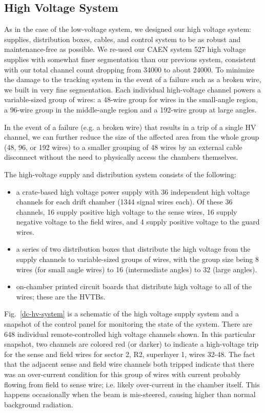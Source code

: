 \subsection{High Voltage System}

As in the case of the low-voltage system, we designed our high voltage system: 
supplies, distribution boxes, cables, and control system to be as robust and 
maintenance-free as possible.  
We re-used our CAEN 
system 527 high voltage supplies with somewhat finer segmentation than our 
previous system, consistent with our total channel count dropping from 34000 
to about 24000.
To minimize the damage to the tracking system in the event of a failure such as
a broken wire, we built in very fine segmentation.
Each individual high-voltage channel powers a variable-sized group of 
wires: a 48-wire group for wires in the small-angle region, a 96-wire group
in the middle-angle region and a 192-wire group at large angles.

In the event of a failure (e.g. a broken wire) that results in a trip
of a single HV channel, we can further reduce the size of the affected
area from the whole group (48, 96, or 192 wires) to a smaller grouping
of 48 wires by an external cable disconnect without the need to 
physically access the chambers themselves.

The high-voltage supply and distribution system consists of the following:
\begin{itemize}
\item a crate-based high voltage power supply with 36 independent
high voltage channels for each drift chamber (1344 signal wires each).
Of these 36 channels, 16 supply positive high voltage to the sense
wires, 16 supply negative voltage to the field wires, and 4 supply
positive voltage to the guard wires.
\item a series of two distribution boxes that distribute the high
voltage from the supply channels to variable-sized groups
of wires, with the group size being 8 wires (for small angle wires)
to 16 (intermediate angles) to 32 (large angles). 
\item  on-chamber printed circuit boards that distribute high voltage
to all of the wires; these are the HVTBs.
\end{itemize}

Fig.~\ref{dc-hv-system} is a schematic of the high voltage
supply system and a snapshot 
of the control panel for monitoring the state of the system.
There are 648 individual remote-controlled high voltage channels
shown.  In this particular snapshot, two channels are colored
red (or darker) to indicate a high-voltage trip for the sense
and field wires for sector 2, R2, superlayer 1, wires 32-48.
The fact that the adjacent sense and field wire channels both
tripped indicate that there was an over-current condition for
this group of wires with current probably flowing from field to
sense wire; i.e. likely over-current in the chamber itself.
This happens occasionally when the beam is mis-steered, causing
higher than normal background radiation.

